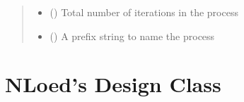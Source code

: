 \documentclass[letterpaper,10pt,english,openany,oneside]{sphinxmanual}
\begin{document}
\begin{fulllineitems}
\begin{fulllineitems}
\begin{quote}
\begin{description}
\begin{itemize}
\item {} 
 () \textendash{} Total number of iterations in the process

\item {} 
 () \textendash{} A prefix string to name the process

\end{itemize}

\end{description}\end{quote}

\end{fulllineitems}


\end{fulllineitems}



\chapter{NLoed’s Design Class}
\label{\detokenize{nloed:module-nloed.design}}\label{\detokenize{nloed:nloed-s-design-class}}
\end{document}
